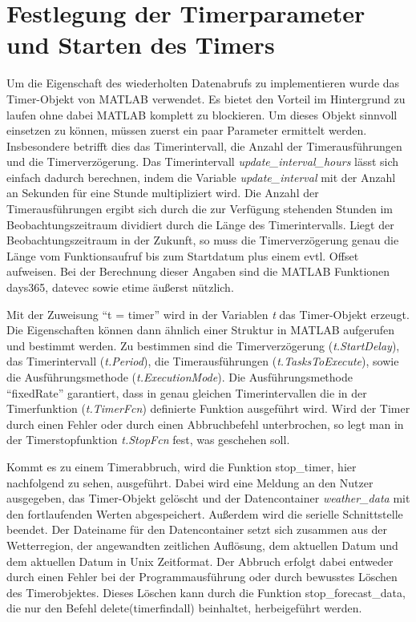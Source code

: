 \section{Festlegung der Timerparameter und Starten des Timers}
Um die Eigenschaft des wiederholten Datenabrufs zu implementieren wurde das Timer-Objekt von MATLAB verwendet. Es bietet den Vorteil im Hintergrund zu laufen ohne dabei MATLAB komplett zu blockieren. Um dieses Objekt sinnvoll einsetzen zu können, müssen zuerst ein paar Parameter ermittelt werden. Insbesondere betrifft dies das Timerintervall, die Anzahl der Timerausführungen und die Timerverzögerung. Das Timerintervall \textit{update\_interval\_hours} lässt sich einfach dadurch berechnen, indem die Variable \textit{update\_interval} mit der Anzahl an Sekunden für eine Stunde multipliziert wird. Die Anzahl der Timerausführungen ergibt sich durch die zur Verfügung stehenden Stunden im Beobachtungszeitraum dividiert durch die Länge des Timerintervalls. Liegt der Beobachtungszeitraum in der Zukunft, so muss die Timerverzögerung genau die Länge vom Funktionsaufruf bis zum Startdatum plus einem evtl. Offset aufweisen. Bei der Berechnung dieser Angaben sind die MATLAB Funktionen \textsf{days365}, \textsf{datevec} sowie \textsf{etime} äußerst nützlich.

Mit der Zuweisung \enquote{t = timer} wird in der Variablen \textit{t} das Timer-Objekt erzeugt. Die Eigenschaften können dann ähnlich einer Struktur in MATLAB aufgerufen und bestimmt werden. Zu bestimmen sind die Timerverzögerung (\textit{t.StartDelay}), das Timerintervall (\textit{t.Period}), die Timerausführungen (\textit{t.TasksToExecute}), sowie die Ausführungsmethode (\textit{t.ExecutionMode}). Die Ausführungsmethode \enquote{fixedRate} garantiert, dass in genau gleichen Timerintervallen die in der Timerfunktion (\textit{t.TimerFcn}) definierte Funktion ausgeführt wird. Wird der Timer durch einen Fehler oder durch einen Abbruchbefehl unterbrochen, so legt man in der Timerstopfunktion \textit{t.StopFcn} fest, was geschehen soll. 
    
Kommt es zu einem Timerabbruch, wird die Funktion \textsf{stop\_timer}, hier nachfolgend zu sehen, ausgeführt.  Dabei wird eine Meldung an den Nutzer ausgegeben, das Timer-Objekt gelöscht und der Datencontainer \textit{weather\_data} mit den fortlaufenden Werten abgespeichert. Außerdem wird die serielle Schnittstelle beendet. Der Dateiname für den Datencontainer setzt sich zusammen aus der Wetterregion, der angewandten zeitlichen Auflösung, dem aktuellen Datum und dem aktuellen Datum in Unix Zeitformat. Der Abbruch erfolgt dabei entweder durch einen Fehler bei der Programmausführung oder durch bewusstes Löschen des Timerobjektes. Dieses Löschen kann durch die Funktion \textsf{stop\_forecast\_data}, die nur den Befehl \textsf{delete(timerfindall)} beinhaltet, herbeigeführt werden.
    
